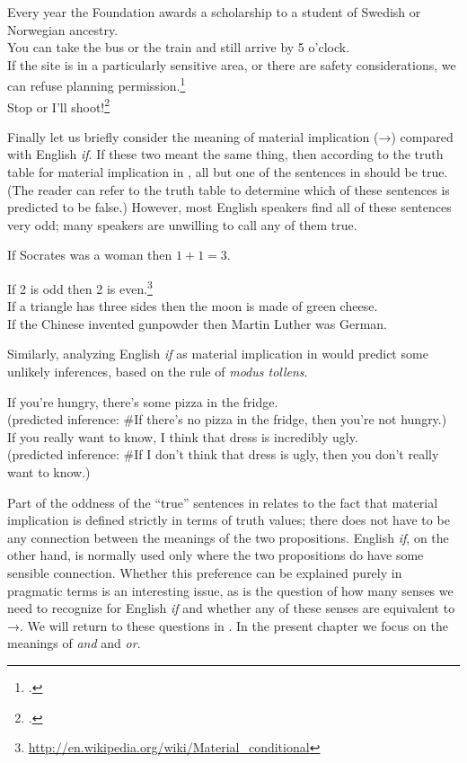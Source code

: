 \ea \label{ex:9.5}
\ea Every year the Foundation awards a scholarship to a student of {Swedish} or {Norwegian} ancestry.\\
\ex You can take the bus or the train and still arrive by 5 o’clock.\\
\ex If the site is in a particularly sensitive area, or there are safety considerations, we can refuse planning permission.\footnote{\citet[113]{Saeed2009}.}\\
\ex Stop or I’ll shoot!\footnote{\citet[113]{Saeed2009}.}
                       \z
\z


Finally let us briefly consider the meaning of material implication (→) compared with English \textit{if}. If these two meant the same thing, then according to the truth table for material implication in , all but one of the sentences in  should be true. (The reader can refer to the truth table to determine which of these sentences is predicted to be false.) However, most English speakers find all of these sentences very odd; many speakers are unwilling to call any of them true.


\ea \label{ex:9.6}
\ea If Socrates was a woman then $1+1=3$.\footnotemark{} \\\addtocounter{footnote}{-1}
\ex If 2 is odd then 2 is even.\footnote{\url{http://en.wikipedia.org/wiki/Material_conditional}}\\
\ex If a triangle has three sides then the moon is made of green cheese.\\
\ex If the {Chinese} invented gunpowder then Martin Luther was {German}.
                       \z
\z


Similarly, analyzing English \textit{if} as material implication in  would predict some unlikely inferences, based on the rule of \textit{modus tollens}.


\ea \label{ex:9.7}
\ea If you’re hungry, there’s some pizza in the fridge.\\
  (predicted inference: \#If there’s no pizza in the fridge, then you’re not hungry.)\\
\ex If you really want to know, I think that dress is incredibly ugly.\\
  (predicted inference: \#If I don’t think that dress is ugly, then you don’t really want to know.)
                       \z
\z


Part of the oddness of the “true” sentences in  relates to the fact that material implication is defined strictly in terms of truth values; there does not have to be any connection between the meanings of the two propositions. English \textit{if}, on the other hand, is normally used only where the two propositions do have some sensible connection. Whether this preference can be explained purely in pragmatic terms is an interesting issue, as is the question of how many senses we need to recognize for English \textit{if} and whether any of these senses are equivalent to →. We will return to these questions in . In the present chapter we focus on the meanings of \textit{and} and \textit{or}.


